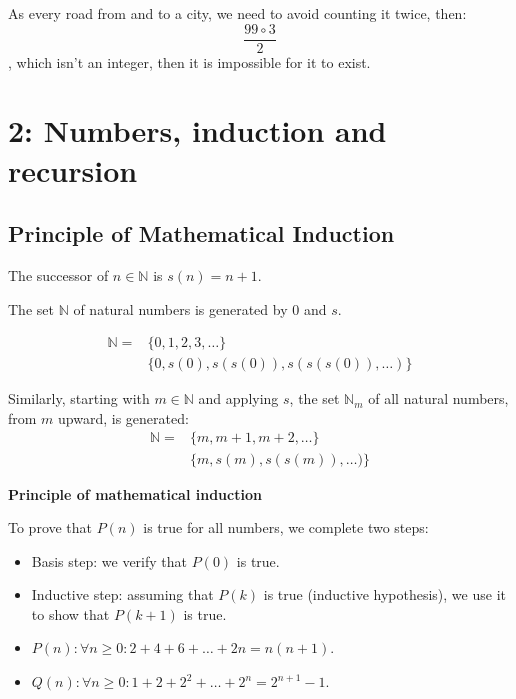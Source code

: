 \documentclass[12pt, a4paper]{book}
\begin{document}
As every road from and to a city, we need to avoid counting it twice, then:
$$\displaystyle\frac{99 \circ 3}{2}$$, 
which isn't an integer, then it is impossible for it to exist. 



\chapter{2: Numbers, induction and recursion}

\section{Principle of Mathematical Induction}
The successor of $n\in\mathbb{N}$ is $s(n)=n+1$.

The set $\mathbb{N}$ of natural numbers is generated by $0$ and $s$.

\[
    \begin{aligned}
        \mathbb{N} = &\{0,1,2,3,\ldots\} \\
        &\{0,s(0),s(s(0)),s(s(s(0)),\ldots)\}
    \end{aligned}
\]

Similarly, starting with $m\in\mathbb{N}$ and applying $s$, the set $\mathbb{N}_m$ of all natural numbers, from $m$ upward, is generated:
\[
    \begin{aligned}
        \mathbb{N} = &\{m,m+1,m+2,\ldots\} \\
        &\{m,s(m),s(s(m)),\ldots)\}
    \end{aligned}
\]

\begin{defn}
    \textbf{Principle of mathematical induction}

    To prove that $P(n)$ is true for all numbers, we complete two steps:
    \begin{itemize}
        \item Basis step: we verify that $P(0)$ is true.
        \item Inductive step: assuming that $P(k)$ is true (inductive hypothesis), we use it to show that $P(k+1)$ is true.
    \end{itemize}
\end{defn}

\begin{exmp}
    \begin{itemize}
        \item $P(n): \forall n \geq 0: 2+4+6+\ldots +2n = n(n+1)$.
        \item $Q(n): \forall n \geq 0: 1+2+2^2+\ldots + 2^n = 2^{n+1}-1$.
    \end{itemize}
\end{exmp}
\end{document}
